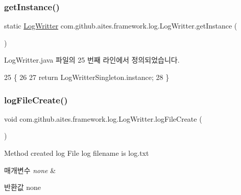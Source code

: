 \subsubsection{\texorpdfstring{get\+Instance()}{getInstance()}}
{\footnotesize\ttfamily static \mbox{\hyperlink{classcom_1_1github_1_1aites_1_1framework_1_1log_1_1_log_writter}{Log\+Writter}} com.\+github.\+aites.\+framework.\+log.\+Log\+Writter.\+get\+Instance (\begin{DoxyParamCaption}{ }\end{DoxyParamCaption})\hspace{0.3cm}{\ttfamily [static]}}



Log\+Writter.\+java 파일의 25 번째 라인에서 정의되었습니다.


\begin{DoxyCode}
25                                           \{
26 
27         \textcolor{keywordflow}{return} LogWritterSingleton.instance;
28     \}
\end{DoxyCode}
\mbox{\label{classcom_1_1github_1_1aites_1_1framework_1_1log_1_1_log_writter_a2640594d456b80388821352e84b3c690}} 
\subsubsection{\texorpdfstring{log\+File\+Create()}{logFileCreate()}}
{\footnotesize\ttfamily void com.\+github.\+aites.\+framework.\+log.\+Log\+Writter.\+log\+File\+Create (\begin{DoxyParamCaption}{ }\end{DoxyParamCaption})}



Method created log File log filename is log.\+txt 


\begin{DoxyParams}{매개변수}
{\em none} & \\
\hline
\end{DoxyParams}
\begin{DoxyReturn}{반환값}
none 
\end{DoxyReturn}


